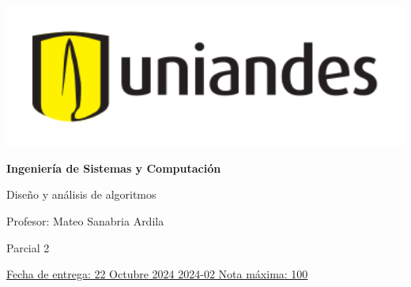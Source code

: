 \documentclass[12pt, a4paper]{exam}
\begin{document}
	\noindent
	\begin{minipage}[l]{0.1\textwidth}
		\noindent
		\includegraphics[width=1.8\textwidth]{Logosimbolo-uniandes_horizontal.png}
	\end{minipage}
\hfill
\begin{minipage}[c]{0.8\textwidth}
	\begin{center}
		{\large \textbf{Ingeniería de Sistemas y Computación} \par
		\large	Diseño y análisis de algoritmos	\par
		\small  Profesor: Mateo Sanabria Ardila	\par
		\small  Parcial 2	\par
		}
	\end{center}
\end{minipage}
\par
\vspace{0.2in}
\noindent
\uline{Fecha de entrega: 22 Octubre 2024	\hfill  2024-02		\hfill Nota máxima: 100}
\par 
\vspace{0.15in}
\end{document}
